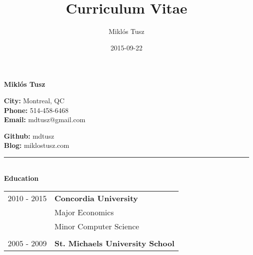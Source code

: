 \documentclass[notitlepage,oneside,draft]{article}
\title{Curriculum Vitae}
\author{Miklós Tusz}
\date{2015-09-22}
\begin{document}
\begin{flushleft}

  \Huge
  \textbf{Miklós Tusz}

  \small

  \begin{multicols}{2}

    \begin{flushleft}
      \textbf{City:} Montreal, QC \\
      \textbf{Phone:} 514-458-6468 \\
      \textbf{Email:} mdtusz@gmail.com \\
    \end{flushleft}

    \begin{flushright}
      \textbf{Github:} mdtusz \\
      \textbf{Blog:} miklostusz.com \\
    \end{flushright}

  \end{multicols}

  \rule{\textwidth}{1pt}\\[6pt]

  \large
  \textbf{Education} \\
  \vspace{12pt}
  \normalsize
  \begin{tabular}{ p{86pt} | l  }
    2010 - 2015 & \textbf{Concordia University} \\
    & Major Economics \\
    & Minor Computer Science \\
    & \\
    2005 - 2009 & \textbf{St. Michaels University School} \\
  \end{tabular}
  \vspace{24pt}



\end{flushleft}
\end{document}
